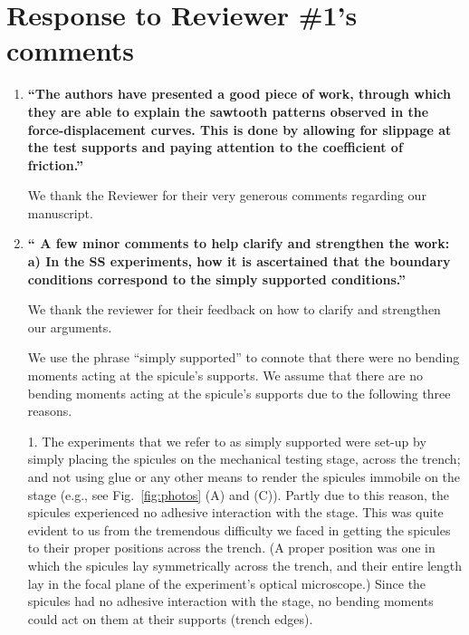 \documentclass[11pt,letterpaper]{report}
\begin{document}
\clearpage
\section*{Response to Reviewer \#1's comments}
\label{rev1}

\begin{enumerate}[label=\textit{1.\arabic*},wide, labelwidth=!, labelindent=0pt]

\item \label{r1c1} {\bf ``The authors have presented a good piece of work, through which they are able to explain the sawtooth patterns observed in the force-displacement curves. This is done by allowing for slippage at the test supports and paying attention to the coefficient of friction.''}



We thank the Reviewer for their very generous comments regarding our manuscript.

\newpage
\item \label{r1c2} {\bf `` A few minor comments to help clarify and strengthen the work: a) In the SS experiments, how it is ascertained that the boundary conditions correspond to the simply supported conditions.''}


We thank the reviewer for their feedback on how to clarify and strengthen our arguments.


We use the phrase ``simply supported'' to connote that there were no bending moments acting at the spicule's supports. We assume that there are no bending moments acting at the spicule's supports due to the following three reasons.

1. The experiments that we refer to as simply supported were set-up by simply placing the spicules on the mechanical testing stage, across the trench; and not using glue or any other means to render the spicules immobile on the stage (e.g., see Fig.~\ref{fig:photos} (A) and (C)). Partly due to this reason, the spicules experienced no adhesive interaction with the stage. This was  quite evident to us from the  tremendous difficulty we faced in getting the spicules to their proper positions across the trench. (A proper position was one in which
the spicules lay symmetrically across the trench, and their entire length lay in the focal plane of the experiment's optical microscope.)  Since the spicules had no adhesive interaction with the stage, no bending moments could act on them at their supports (trench edges).


\end{enumerate}
\end{document}
